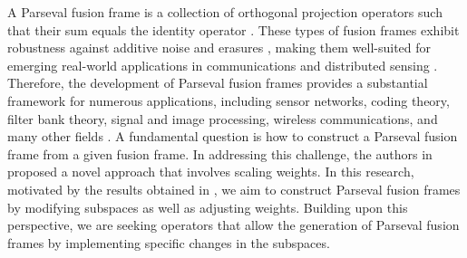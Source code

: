 \documentclass[sn-mathphys-num]{sn-jnl}%
\theoremstyle{definition}
\theoremstyle{remark}
\numberwithin{equation}{section}
\begin{document}
A Parseval fusion frame is a collection of orthogonal projection operators such that their sum equals the identity operator \cite{frame of subspace}. These types of fusion frames exhibit robustness against additive noise and erasures \cite{scaling weights, Weaving Hilbert space, Norm retrieval algorithms,Cahill-Fickus,CasazzaFickus, Rahimi}, making them well-suited for emerging real-world applications in communications and distributed sensing \cite{excess of fusion, Arabyani dual, A.A.SH}. Therefore, the development of Parseval fusion frames provides a substantial framework for numerous applications, including sensor networks, coding theory, filter bank theory, signal and image processing, wireless communications, and many other fields \cite{Cahill-Fickus, CasazzaFickus, Casazza17, convex geometry}. A fundamental question is how to construct a Parseval fusion frame from a given fusion frame. In addressing this challenge, the authors in \cite{scaling weights} proposed a novel approach that involves scaling weights. In this research, motivated by the results obtained in \cite{scaling weights,Casazza17,dual scalable frames,Gitta 13,convex geometry,Rahimi scalable}, we aim to construct Parseval fusion frames by modifying subspaces as well as adjusting weights. Building upon this perspective, we are seeking operators that allow the generation of Parseval fusion frames by implementing specific changes in the subspaces.
\end{document}
